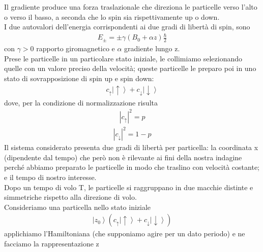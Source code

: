 Il gradiente produce una forza traslazionale che direziona le particelle verso l'alto o verso il basso, a seconda che lo spin sia rispettivamente up o down. \\
I due autovalori dell'energia corrispondenti ai due gradi di libertà di spin, sono
\begin{equation}\begin{split}
E_{\pm}=\pm\gamma(B_{0}+\alpha z)\frac{\hbar}{2}
\end{split}\end{equation}
con $\gamma>0$ rapporto giromagnetico  e  $\alpha$ gradiente lungo z.\\
Prese le particelle in un particolare stato iniziale, le collimiamo selezionando quelle con un valore preciso della velocità; queste particelle le preparo poi in uno stato di sovrapposizione di spin up e spin down:
\begin{equation}\begin{split}
c_{\uparrow}\left|\uparrow\right\rangle+c_{\downarrow}\left|\downarrow\right\rangle
\end{split}\end{equation}
dove, per la condizione di normalizzazione risulta
\begin{equation}\begin{split}
\left|c_{\uparrow}\right|^2 = p
\end{split}\end{equation}
\begin{equation}\begin{split}
\left|c_{\downarrow}\right|^2 = 1-p
\end{split}\end{equation}
Il sistema considerato presenta due gradi di libertà per particella: la coordinata x (dipendente dal tempo) che però non è rilevante ai fini della nostra indagine perché abbiamo preparato le particelle in modo che traslino con velocità costante; e il tempo di nostro interesse.\\
Dopo un tempo di volo T, le particelle si raggruppano in due macchie distinte e simmetriche rispetto alla direzione di volo.\\
Consideriamo una particella nello stato iniziale
\begin{equation}\begin{split}
\left|z_{0}\right\rangle (c_{\uparrow}\left|\uparrow\right\rangle+c_{\downarrow}\left|\downarrow\right\rangle)
\end{split}\end{equation}
applichiamo l'Hamiltoniana (che supponiamo agire per un dato periodo) e ne facciamo la rappresentazione z\\
